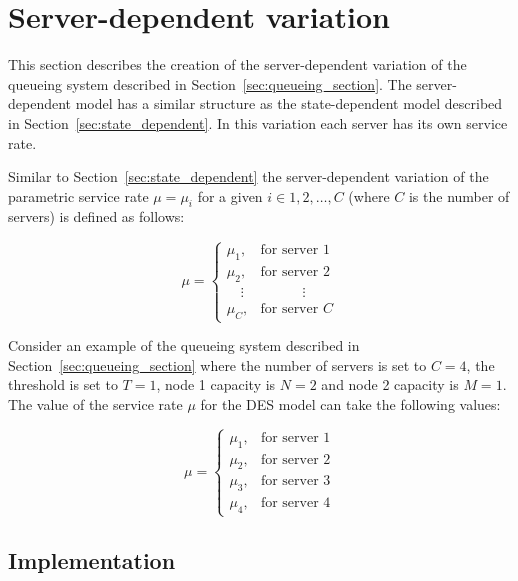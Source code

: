 \section{Server-dependent variation}\label{sec:server_dependent}

This section describes the creation of the server-dependent variation of the
queueing system described in Section~\ref{sec:queueing_section}.
The server-dependent model has a similar structure as the state-dependent model
described in Section~\ref{sec:state_dependent}.
In this variation each server has its own service rate.

Similar to Section~\ref{sec:state_dependent} the server-dependent variation of
the parametric service rate \(\mu = \mu_i\) for a given
\(i \in {1, 2, \dots, C}\) (where \(C\) is the number of servers) is defined as
follows:

\begin{equation}\label{eq:server_dependent_service_rate}
    \mu =
    \begin{cases}
        \mu_1, & \text{for server } 1 \\
        \mu_2, & \text{for server } 2 \\
        \quad \vdots & \qquad \quad \vdots \\
        \mu_C, & \text{for server } C
    \end{cases}
\end{equation}

Consider an example of the queueing system described in
Section~\ref{sec:queueing_section} where the number of servers is set to
\(C = 4\), the threshold is set to \(T = 1\), node 1 capacity is \(N = 2\) and
node 2 capacity is \(M = 1\).
The value of the service rate \(\mu\) for the DES model can take the following
values:

\begin{equation*}
    \mu =
    \begin{cases}
        \mu_1, & \text{for server } 1 \\
        \mu_2, & \text{for server } 2 \\
        \mu_3, & \text{for server } 3 \\
        \mu_4, & \text{for server } 4
    \end{cases}
\end{equation*}



\subsection{Implementation}

